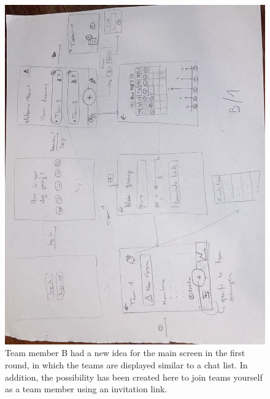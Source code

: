 \documentclass[11pt]{article}
\begin{document}
\begin{figure}[!h]
    \centering
    \includegraphics[scale = 0.45,angle=90]{figures/B1.jpg}
    \caption{Team member B had a new idea for the main screen in the first round, in which the teams are displayed similar to a chat list. In addition, the possibility has been created here to join teams yourself as a team member using an invitation link.}
\end{figure}
\clearpage
\end{document}
